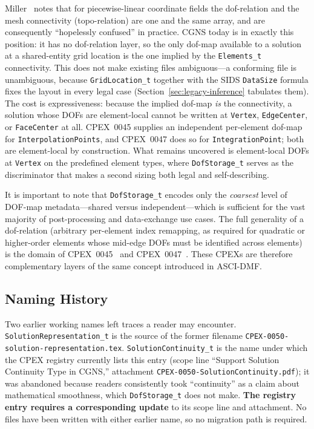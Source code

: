 \documentclass[11pt,letterpaper]{article}
\begin{document}
Miller~\cite{miller2003} notes that for piecewise-linear coordinate fields the dof-relation
and the mesh connectivity (topo-relation) are one and the same array, and are consequently
``hopelessly confused'' in practice.  CGNS today is in exactly this position: it has no
dof-relation layer, so the only dof-map available to a solution at a shared-entity grid
location is the one implied by the \texttt{Elements\_t} connectivity.  This does not make
existing files ambiguous---a conforming file is unambiguous, because \texttt{GridLocation\_t}
together with the SIDS \texttt{DataSize} formula fixes the layout in every legal case
(Section~\ref{sec:legacy-inference} tabulates them).  The cost is expressiveness: because the
implied dof-map \emph{is} the connectivity, a solution whose DOFs are element-local cannot be
written at \texttt{Vertex}, \texttt{EdgeCenter}, or \texttt{FaceCenter} at all.  CPEX~0045
supplies an independent per-element dof-map for \texttt{InterpolationPoints}, and CPEX~0047
does so for \texttt{IntegrationPoint}; both are element-local by construction.  What remains
uncovered is element-local DOFs at \texttt{Vertex} on the predefined element types, where
\texttt{DofStorage\_t} serves as the discriminator that makes a second sizing both legal and
self-describing.

It is important to note that \texttt{DofStorage\_t} encodes only the \emph{coarsest} level
of DOF-map metadata---shared versus independent---which is sufficient for the vast majority
of post-processing and data-exchange use cases.  The full generality of a dof-relation
(arbitrary per-element index remapping, as required for quadratic or higher-order elements
whose mid-edge DOFs must be identified across elements) is the domain of
CPEX~0045~\cite{cpex0045} and CPEX~0047~\cite{cpex0047}.  These CPEXs are therefore
complementary layers of the same concept introduced in ASCI-DMF.

\subsection{Naming History}
\label{sec:naming-history}

Two earlier working names left traces a reader may encounter.
\texttt{SolutionRepresentation\_t} is the source of the former filename
\texttt{CPEX-0050-solution-representation.tex}.
\texttt{SolutionContinuity\_t} is the name under which the CPEX registry
currently lists this entry (scope line ``Support Solution Continuity
Type in CGNS,'' attachment \texttt{CPEX-0050-SolutionContinuity.pdf});
it was abandoned because readers consistently took ``continuity'' as a
claim about mathematical smoothness, which \texttt{DofStorage\_t} does
not make.  \textbf{The registry entry requires a corresponding update}
to its scope line and attachment.  No files have been written with
either earlier name, so no migration path is required.
\end{document}
